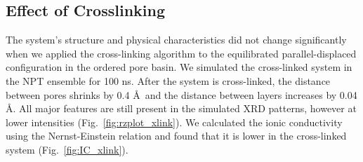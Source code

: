 \documentclass[journal=jpcbfk,manusciprt=article]{achemso}
\begin{document}
  \subsection{Effect of Crosslinking}\label{section:xlink}

  The system's structure and physical characteristics did not change
  significantly when we applied the cross-linking algorithm to the equilibrated
  parallel-displaced configuration in the ordered pore basin. We simulated
  the cross-linked system in the NPT ensemble for 100 ns. After the system is
  cross-linked, the distance between pores shrinks by 0.4 \AA~and the distance
  between layers increases by 0.04 \AA. All major features are still present in
  the simulated XRD patterns, however at lower intensities
  (Fig.~\ref{fig:rzplot_xlink}). We calculated the ionic conductivity using the
  Nernst-Einstein relation and found that it is lower in the cross-linked system
  (Fig.~\ref{fig:IC_xlink}).
\end{document}
